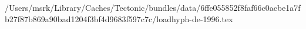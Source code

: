 /Users/msrk/Library/Caches/Tectonic/bundles/data/6ffe055852f8faf66c0acbe1a7fb27f87b869a90bad1204f3bf4d9683f597c7c/loadhyph-de-1996.tex